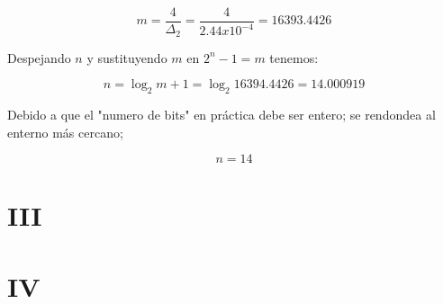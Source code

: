 \documentclass[11p]{report}
\begin{document}
$$
m = \frac{4}{\Delta_2} = \frac{4}{2.44x10^{-4}} = 16393.4426
$$

Despejando $n$ y sustituyendo $m$ en $2^n - 1 = m$ tenemos:

$$
n = \log_2{m+1} = \log_2{16394.4426} = 14.000919
$$

Debido a que el "numero de bits" en pr\'actica debe ser entero; se rendondea al enterno más cercano;

$$
n = 14
$$

\section{III}


\section{IV}
\end{document}
